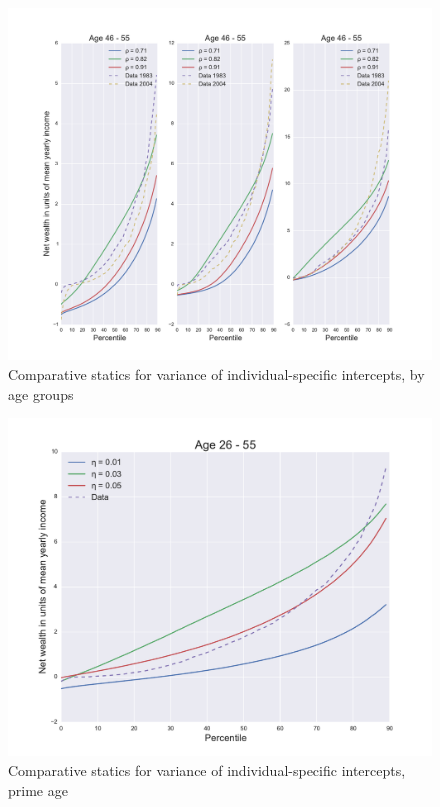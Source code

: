 \begin{figure}
\includegraphics[width=\columnwidth]{comp_stat_rho_agedetail}
\caption{Comparative statics for variance of individual-specific intercepts, by age groups}
\label{fig:comp_stat_rho_agedetail}
\end{figure}

\begin{figure}
\includegraphics[width=\columnwidth]{comp_stat_eta}
\caption{Comparative statics for variance of individual-specific intercepts, prime age}
\label{fig:comp_stat_eta}
\end{figure}

